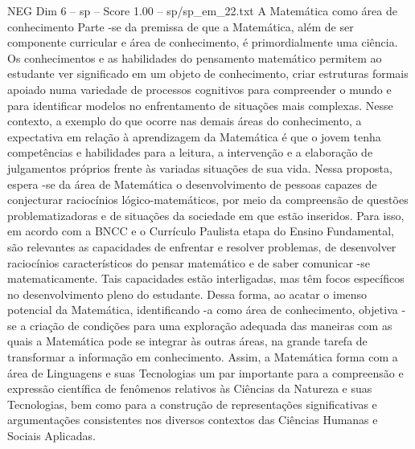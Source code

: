 \begin{textsample}{NEG Dim 6 – sp – Score 1.00 – sp/sp\_em\_22.txt}  \label{ex:f6_neg_207}
A Matemática como área de conhecimento Parte -se da premissa de que a Matemática, além de ser componente curricular e área de conhecimento, é primordialmente uma ciência.
Os conhecimentos e as habilidades do pensamento matemático permitem ao estudante ver significado em um objeto de conhecimento, criar estruturas formais apoiado numa variedade de processos cognitivos para compreender o mundo e para identificar modelos no enfrentamento de situações mais complexas.
Nesse contexto, a exemplo do que ocorre nas demais áreas do conhecimento, a expectativa em relação à aprendizagem da Matemática é que o jovem tenha competências e habilidades para a leitura, a intervenção e a elaboração de julgamentos próprios frente às variadas situações de sua vida.
Nessa proposta, espera -se da área de Matemática o desenvolvimento de pessoas capazes de conjecturar raciocínios lógico-matemáticos, por meio da compreensão de questões problematizadoras e de situações da sociedade em que estão inseridos.
Para isso, em acordo com a BNCC e o Currículo Paulista etapa do Ensino Fundamental, são relevantes as capacidades de enfrentar e resolver problemas, de desenvolver raciocínios característicos do pensar matemático e de saber comunicar -se matematicamente.
Tais capacidades estão interligadas, mas têm focos específicos no desenvolvimento pleno do estudante.
Dessa forma, ao acatar o imenso potencial da Matemática, identificando -a como área de conhecimento, objetiva -se a criação de condições para uma exploração adequada das maneiras com as quais a Matemática pode se integrar às outras áreas, na grande tarefa de transformar a informação em conhecimento.
Assim, a Matemática forma com a área de Linguagens e suas Tecnologias um par importante para a compreensão e expressão científica de fenômenos relativos às Ciências da Natureza e suas Tecnologias, bem como para a construção de representações significativas e argumentações consistentes nos diversos contextos das Ciências Humanas e Sociais Aplicadas.

\end{textsample}
